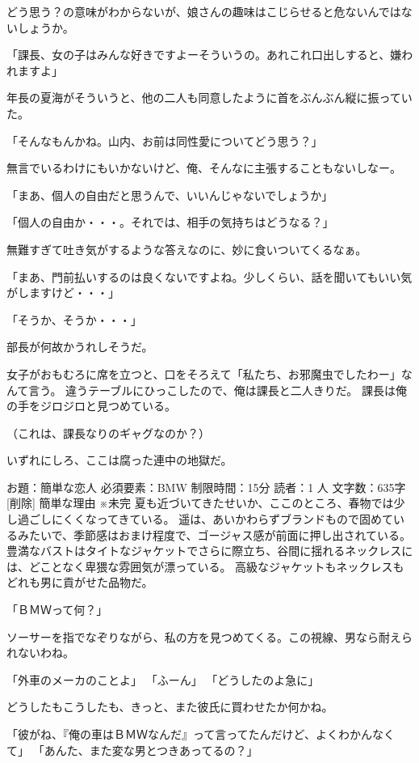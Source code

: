 どう思う？の意味がわからないが、娘さんの趣味はこじらせると危ないんではないしょうか。

「課長、女の子はみんな好きですよーそういうの。あれこれ口出しすると、嫌われますよ」

年長の夏海がそういうと、他の二人も同意したように首をぶんぶん縦に振っていた。

「そんなもんかね。山内、お前は同性愛についてどう思う？」

無言でいるわけにもいかないけど、俺、そんなに主張することもないしなー。

「まあ、個人の自由だと思うんで、いいんじゃないでしょうか」

「個人の自由か・・・。それでは、相手の気持ちはどうなる？」

無難すぎて吐き気がするような答えなのに、妙に食いついてくるなぁ。

「まあ、門前払いするのは良くないですよね。少しくらい、話を聞いてもいい気がしますけど・・・」

「そうか、そうか・・・」

部長が何故かうれしそうだ。

女子がおもむろに席を立つと、口をそろえて「私たち、お邪魔虫でしたわー」なんて言う。
違うテーブルにひっこしたので、俺は課長と二人きりだ。
課長は俺の手をジロジロと見つめている。

（これは、課長なりのギャグなのか？）

いずれにしろ、ここは腐った連中の地獄だ。




 お題：簡単な恋人 必須要素：BMW 制限時間：15分 読者：1 人 文字数：635字
[削除]
簡単な理由 ※未完
夏も近づいてきたせいか、ここのところ、春物では少し過ごしにくくなってきている。
遥は、あいかわらずブランドもので固めているみたいで、季節感はおまけ程度で、ゴージャス感が前面に押し出されている。豊満なバストはタイトなジャケットでさらに際立ち、谷間に揺れるネックレスには、どことなく卑猥な雰囲気が漂っている。
高級なジャケットもネックレスもどれも男に貢がせた品物だ。

「ＢＭＷって何？」

ソーサーを指でなぞりながら、私の方を見つめてくる。この視線、男なら耐えられないわね。

「外車のメーカのことよ」
「ふーん」
「どうしたのよ急に」

どうしたもこうしたも、きっと、また彼氏に買わせたか何かね。

「彼がね、『俺の車はＢＭＷなんだ』って言ってたんだけど、よくわかんなくて」
「あんた、また変な男とつきあってるの？」

